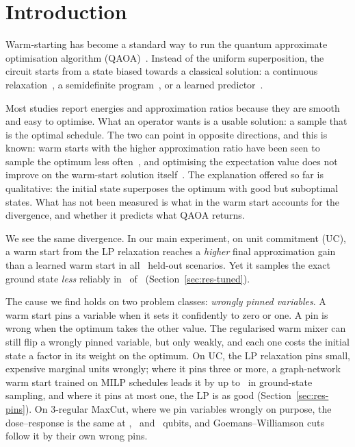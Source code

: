 \section{Introduction}
\label{sec:intro}

Warm-starting has become a standard way to run the quantum approximate optimisation algorithm (QAOA)~\cite{farhi2014qaoa}. Instead of the uniform superposition, the circuit starts from a state biased towards a classical solution: a continuous relaxation~\cite{egger2021warm}, a semidefinite program~\cite{tate2023sdp}, or a learned predictor~\cite{jain2022gnn}.

Most studies report energies and approximation ratios because they are smooth and easy to optimise. What an operator wants is a usable solution: a sample that is the optimal schedule. The two can point in opposite directions, and this is known: warm starts with the higher approximation ratio have been seen to sample the optimum less often~\cite{dehn2023hybrid,bhattacharyya2025qubo}, and optimising the expectation value does not improve on the warm-start solution itself~\cite{feeney2024bsp}. The explanation offered so far is qualitative: the initial state superposes the optimum with good but suboptimal states. What has not been measured is what in the warm start accounts for the divergence, and whether it predicts what QAOA returns.

We see the same divergence. In our main experiment, on unit commitment (UC), a warm start from the LP relaxation reaches a \emph{higher} final approximation gain than a learned warm start in all \GfinalCoracleMinusDL\ held-out scenarios. Yet it samples the exact ground state \emph{less} reliably in \CoracleMinusDW\ of \CoracleMinusDN\ (Section~\ref{sec:res-tuned}).

The cause we find holds on two problem classes: \emph{wrongly pinned variables}. A warm start pins a variable when it sets it confidently to zero or one. A pin is wrong when the optimum takes the other value. The regularised warm mixer can still flip a wrongly pinned variable, but only weakly, and each one costs the initial state a factor in its weight on the optimum. On UC, the LP relaxation pins small, expensive marginal units wrongly; where it pins three or more, a graph-network warm start trained on MILP schedules leads it by up to \DoseLtwoThree\ in ground-state sampling, and where it pins at most one, the LP is as good (Section~\ref{sec:res-pins}). On 3-regular MaxCut, where we pin variables wrongly on purpose, the dose--response is the same at \MCSizeTwelve, \MCSizeSixteen\ and \MCSizeTwenty\ qubits, and Goemans--Williamson cuts follow it by their own wrong pins.


